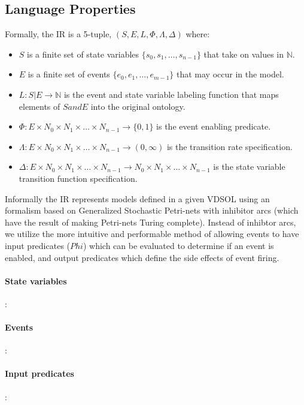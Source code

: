 \documentclass[11pt]{article}
\begin{document}
\subsection{Language Properties}

Formally, the IR is a 5-tuple, $(S, E, L, \Phi, \Lambda, \Delta)$ where:
\begin{itemize}
\item $S$ is a finite set of state variables $\{s_0, s_1, \ldots, s_{n-1}\}$ that take on values in $\mathbb{N}$.
\item $E$ is a finite set of events $\{e_0, e_1, \ldots, e_{m-1}\}$ that may occur in the model.
\item $L: S|E \rightarrow \mathbb{N}$ is the event and state variable labeling function that maps elements of $S and E$ into the original ontology.
\item $\Phi: E \times N_0 \times N_1 \times \ldots \times N_{n-1} \rightarrow \{0, 1\}$ is the event enabling predicate.
\item $\Lambda: E \times N_0 \times N_1 \times \ldots \times N_{n-1} \rightarrow (0, \infty)$ is the transition rate specification.
\item $\Delta: E \times N_0 \times N_1 \times \ldots \times N_{n-1} \rightarrow N_0 \times N_1 \times \ldots \times N_{n-1}$ is the state variable transition function specification.
\end{itemize}

Informally the IR represents models defined in a given VDSOL using an formalism based on Generalized Stochastic Petri-nets with inhibitor arcs (which have the result of making Petri-nets Turing complete).  Instead of inhibtor arcs, we utilize the more intuitive and performable method of allowing events to have input predicates ($Phi$) which can be evaluated to determine if an event is enabled, and output predicates which define the side effects of event firing.

\paragraph{State variables}:

\paragraph{Events}:

\paragraph{Input predicates}:
\end{document}

